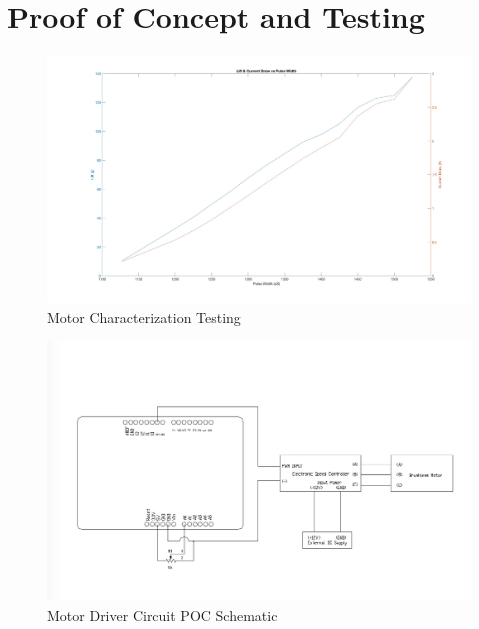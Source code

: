 \section{Proof of Concept and Testing}

\begin{figure}[p]
  \centering
  \includegraphics[width=1\textwidth]{Motor_Characterization.jpg}
  \caption{Motor Characterization Testing}
  \label{fig:Motor_Char}
\end{figure}

\begin{figure}[p]
  \centering
  \includegraphics[width=1\textwidth]{Motor_Driving_Schematic.jpg}
  \caption{Motor Driver Circuit POC Schematic}
  \label{fig:Motor_Drive_Schem}
\end{figure}

